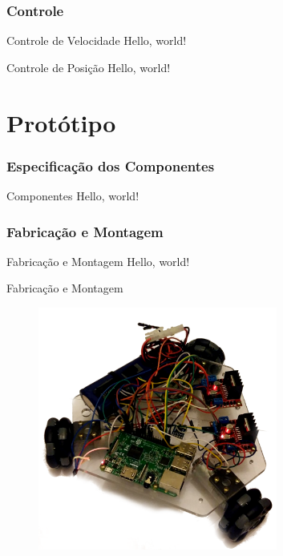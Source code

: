 \documentclass{beamer}
\begin{document}
\subsubsection{Controle}
\begin{frame}{Controle de Velocidade}
  Hello, world!
\end{frame}
\begin{frame}{Controle de Posição}
  Hello, world!
\end{frame}

\section{Protótipo}
\subsubsection{Especificação dos Componentes}
\begin{frame}{Componentes}
  Hello, world!
\end{frame}
\subsubsection{Fabricação e Montagem}
\begin{frame}{Fabricação e Montagem}
  Hello, world!
\end{frame}
\begin{frame}{Fabricação e Montagem}
  \begin{figure}[h]
    \centering
    \includegraphics[width = 0.7\textwidth]{imagens/roboto}
  \end{figure}
  \addtocounter{framenumber}{-1}
\end{frame}
\end{document}
